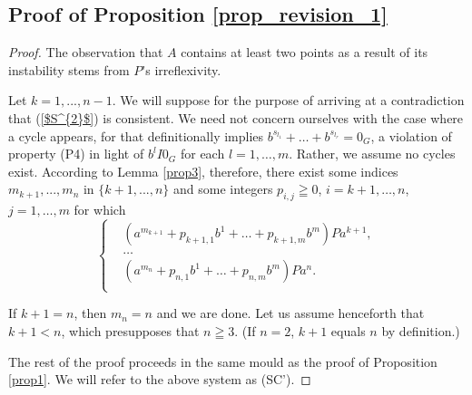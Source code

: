 \documentclass[pdflatex,sn-apa,11pt]{sn-jnl}%
\begin{document}
\subsection{Proof of Proposition \ref{prop_revision_1}}
\label{sec5_2}
\begin{proof}
The observation that $A$ contains at least two points as a result of its instability stems from $P$'s irreflexivity.

Let $k = 1, ..., n-1$. We will suppose for the purpose of arriving at a contradiction that (\ref{$S^{2}$}) is consistent. We need not concern ourselves with the case where a cycle appears, for that definitionally implies $b^{s_{l_1}} + \dots + b^{s_{l_r}} = 0_G$, a violation of property (P4) in light of $b^lI0_G$ for each $l = 1, \dots, m$. Rather, we assume no cycles exist. According to Lemma \ref{prop3}, therefore, there exist some indices $m_{k+1}, ..., m_{n}$ in $\{k+1, ..., n\}$ and some integers $p_{i, j} \geqq 0$, $i = k+1, \dots, n$, $j = 1, \dots, m$ for which
\begin{equation*}
  \left\{
    \begin{aligned}
      & (a^{m_{k+1}} + p_{k+1,1}b^1 + \dots + p_{k+1, m}b^m)Pa^{k+1}, \\
      & \dots \\
      & (a^{m_{n}} + p_{n,1}b^1 + \dots + p_{n, m}b^m)Pa^{n}. \\
    \end{aligned}
  \right.
\end{equation*}

If $k+1 = n$, then $m_n = n$ and we are done. Let us assume henceforth that $k+1 < n$, which presupposes that $n \geqq 3$. (If $n = 2$, $k+1$ equals $n$ by definition.) 

The rest of the proof proceeds in the same mould as the proof of Proposition \ref{prop1}. We will refer to the above system as (SC').





\end{proof}
\end{document}
